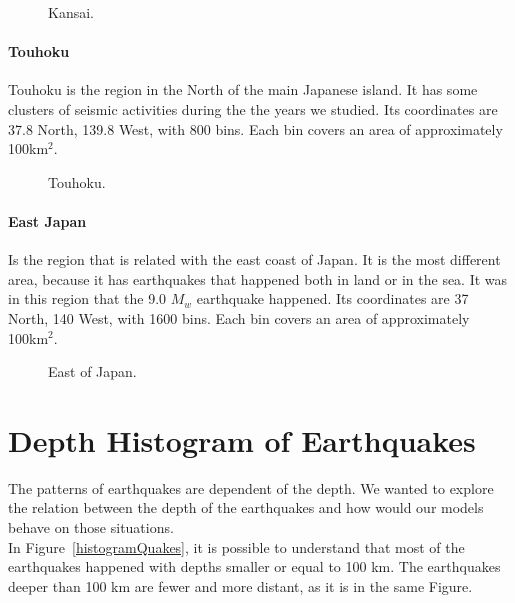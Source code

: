 \begin{figure}[H]
	\centering
	\caption{Kansai.}
	\label{kansai}
\end{figure}



\paragraph{Touhoku} Touhoku is the region in the North of the main Japanese island. It has some clusters of seismic activities during the the years we studied. Its coordinates are 37.8 North, 139.8 West, with  800 bins. Each bin covers an area of approximately 100km$^2$. \\

\begin{figure}[H]
	\centering
	\caption{Touhoku.}
	\label{touhoku}
\end{figure}

\paragraph{East Japan} Is the region that is related with the east coast of Japan. It is the most different area, because it has earthquakes that happened both in land or in the sea. It was in this region that the 9.0 $M_w$ earthquake happened. Its coordinates are 37 North, 140 West, with 1600 bins. Each bin covers an area of approximately 100km$^2$. \\


	\begin{figure}[H]
		\centering
		\caption{East of Japan.}
		\label{eastJapan}
	\end{figure}

\section{Depth Histogram of Earthquakes}

The patterns of earthquakes are dependent of the depth. We wanted to explore the relation between the depth of the earthquakes and how would our models behave on those situations.\\

In Figure~\ref{histogramQuakes}, it is possible to understand that most of the earthquakes happened with depths smaller or equal to 100 km. The earthquakes deeper than 100 km are fewer and more distant, as it is in the same Figure.\\

